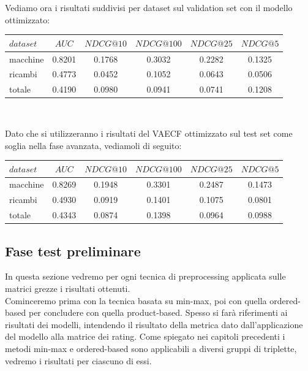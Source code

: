 Vediamo ora i risultati suddivisi per dataset sul validation set con il modello ottimizzato:\\
\begin{center}
\begin{tabular}{|l|c|cccc|}
    \toprule
    $dataset$ &    $AUC$ &  $NDCG@10$ & $NDCG@100$  & $NDCG@25$ & $NDCG@5$  \\
    \midrule
    macchine & 0.8201 & 0.1768 & 0.3032 & 0.2282 & 0.1325 \\
    ricambi & 0.4773 & 0.0452 & 0.1052 & 0.0643 & 0.0506 \\
    totale  & 0.4190 & 0.0980 & 0.0941 & 0.0741 & 0.1208 \\
\bottomrule
\end{tabular}\\
\label{tab:vaecf_val}
\end{center}
Dato che si utilizzeranno i risultati del VAECF ottimizzato sul test set come soglia nella fase avanzata, vediamoli di seguito:\\
\begin{center}
\begin{tabular}{|l|c|cccc|}
    \toprule
    $dataset$ &    $AUC$ &  $NDCG@10$ & $NDCG@100$  & $NDCG@25$ & $NDCG@5$  \\
    \midrule
    macchine & 0.8269 &  0.1948 &   0.3301 &  0.2487 & 0.1473 \\
    ricambi  & 0.4930 &  0.0919 &   0.1401 &  0.1075 & 0.0801 \\
    totale  & 0.4343 &  0.0874 &   0.1398 &  0.0964 & 0.0988 \\

\bottomrule
\end{tabular}
\label{tab:vaecf_test}
\end{center}

\subsection{Fase test preliminare}
In questa sezione vedremo per ogni tecnica di preprocessing applicata sulle matrici grezze i risultati ottenuti.\\
Cominceremo prima con la tecnica basata su min-max, poi con quella ordered-based per concludere con quella product-based. 
Spesso si farà riferimenti ai risultati dei modelli, intendendo il risultato della metrica dato dall'applicazione del modello alla matrice dei rating.
Come spiegato nei capitoli precedenti i metodi min-max e ordered-based sono applicabili a diversi gruppi di triplette, vedremo i risultati per ciascuno di essi.\\

